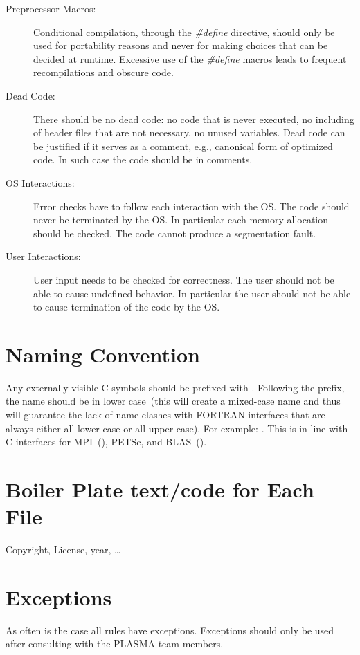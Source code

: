 \begin{description}
\item[Preprocessor Macros:]
Conditional compilation, through the {\em \#define} directive,
should only be used for portability reasons
and never for making choices that can be decided at runtime.
Excessive use of the {\em \#define} macros leads to frequent recompilations and obscure code.

\item[Dead Code:]
There should be no dead code: no code that is never executed, no including
of header files that are not necessary, no unused variables. Dead code can
be justified if it serves as a comment, e.g., canonical form of optimized
code. In such case the code should be in comments.

\item[OS Interactions:]
Error checks have to follow each interaction with the OS.
The code should never be terminated by the OS.
In particular each memory allocation should be checked.
The code cannot produce a segmentation fault.

\item[User Interactions:]
User input needs to be checked for correctness.
The user should not be able to cause undefined behavior.
In particular the user should not be able to cause termination of the code
by the OS.
\end{description}


\section{Naming Convention}

Any externally visible C symbols should be prefixed with .
Following the prefix, the name should be in lower case~(this will create
a mixed-case name and thus will guarantee the lack of name clashes with FORTRAN
interfaces that are always either all lower-case or all upper-case).
For example: . This is in line with C interfaces
for MPI~(), PETSc, and BLAS~().


\section{Boiler Plate text/code for Each File}
Copyright, License, year, \ldots


\section{Exceptions}
As often is the case all rules have exceptions. Exceptions should only be
used after consulting with the PLASMA team members.

